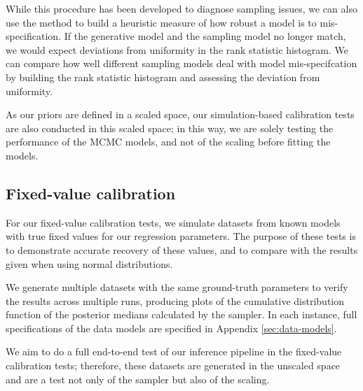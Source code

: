\documentclass[fleqn,usenatbib]{rasti}
\begin{document}
While this procedure has been developed to diagnose sampling issues, we can also
use the method to build a heuristic measure of how robust a model is to
mis-specification. If the generative model and the sampling model no longer
match, we would expect deviations from uniformity in the rank statistic
histogram. We can compare how well different sampling models deal with model
mis-specifcation by building the rank statistic histogram and assessing the
deviation from uniformity.

As our priors are defined in a scaled space, our simulation-based calibration
tests are also conducted in this scaled space; in this way, we are solely
testing the performance of the MCMC models, and not of the scaling before
fitting the models.

\subsection{Fixed-value calibration}
\label{sec:methods.fixed}

For our fixed-value calibration tests, we simulate datasets from known models
with true fixed values for our regression parameters. The purpose of these tests
is to demonstrate accurate recovery of these values, and to compare with the
results given when using normal distributions.

We generate multiple datasets with the same ground-truth parameters to verify
the results across multiple runs, producing plots of the cumulative distribution
function of the posterior medians calculated by the sampler. In each instance,
full specifications of the data models are specified in Appendix
\ref{sec:data-models}.

We aim to do a full end-to-end test of our inference pipeline in the fixed-value
calibration tests; therefore, these datasets are generated in the unscaled space
and are a test not only of the sampler but also of the scaling.



\end{document}
